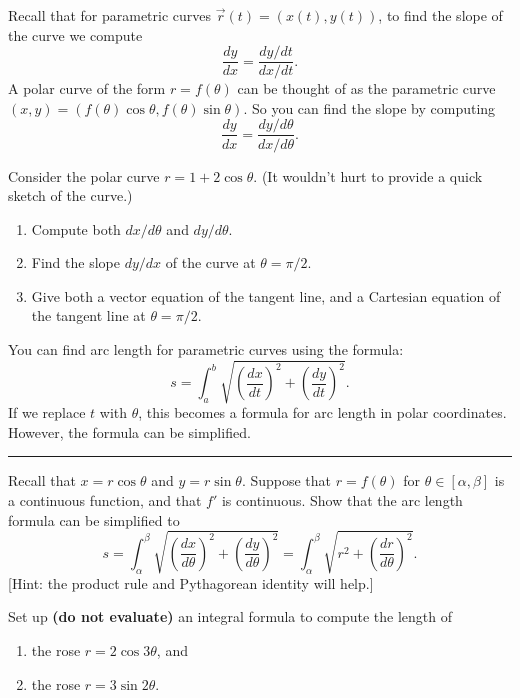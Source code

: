 Recall that for parametric curves $\vec r(t) = (x(t),y(t))$, to find the slope of the curve we compute $$\frac{dy}{dx}=\frac{dy/dt}{dx/dt}.$$ A polar curve of the form $r=f(\theta)$ can be thought of as the parametric curve $(x,y) = (f(\theta)\cos\theta,f(\theta)\sin\theta)$. So you can find the slope by computing
$$\frac{dy}{dx}=\frac{dy/d\theta}{dx/d\theta}.$$

\begin{problem}
%
Consider the polar curve $r=1+2\cos \theta$. (It wouldn't hurt to provide a quick sketch of the curve.)
\begin{enumerate}
\item Compute both $dx/d\theta$ and $dy/d\theta$.
\item Find the slope $dy/dx$ of the curve at $\theta=\pi/2$.
\item Give both a vector equation of the tangent line, and a Cartesian equation of the tangent line at $\theta=\pi/2$.
\end{enumerate}
\end{problem}

You can find arc length for parametric curves using the formula: 
$$s=\int_a^b\sqrt{\left(\frac{dx}{dt}\right)^2+\left(\frac{dy}{dt}\right)^2}.$$ If we replace $t$ with $\theta$, this becomes a formula for arc length in polar coordinates.  However, the formula can be simplified.

\hrule

\begin{problem}
%
Recall that $x=r\cos\theta$ and $y=r\sin\theta$. Suppose that $r=f(\theta)$ for $\theta\in[\alpha,\beta]$ is a continuous function, and that $f'$ is continuous.  
Show that the arc length formula can be simplified to 
$$
s=\int_{\alpha}^{\beta}\sqrt{\left(\frac{dx}{d\theta}\right)^2+\left(\frac{dy}{d\theta}\right)^2} 
= \int_{\alpha}^{\beta}\sqrt{r^2+\left(\frac{dr}{d\theta}\right)^2} .$$
[Hint: the product rule and Pythagorean identity will help.]
\end{problem}

\begin{problem} 
%
Set up \textbf{(do not evaluate)} an integral formula to compute the length of 
\begin{enumerate}
\item the rose $r=2\cos 3\theta$, and
\item the rose $r=3\sin 2\theta$.
\end{enumerate}
\end{problem}


